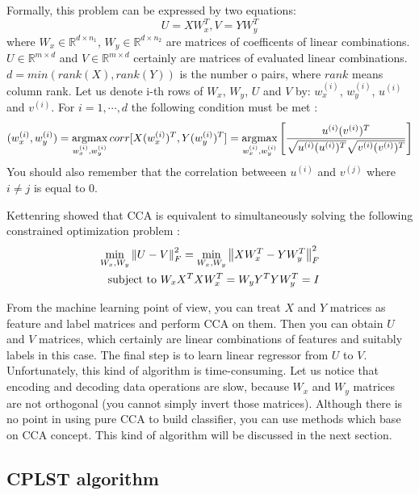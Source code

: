 Formally, this problem can be expressed by two equations:
\begin{equation}\label{eq:cca1}
    U=XW_x^T,   V=YW_y^T    
\end{equation}
where $W_x \in \mathbb{R}^{d \times n_1}$, $W_y \in \mathbb{R}^{d \times n_2}$ are matrices of coefficents of linear combinations. $U \in \mathbb{R}^{m \times d}$ and $V \in \mathbb{R}^{m \times d}$ certainly are matrices of evaluated linear combinations. $d=min(rank(X), rank(Y))$ is the number o pairs, where $rank$ means column rank. Let us denote i-th rows of $W_x$, $W_y$, $U$ and $V$ by: $w_x^{(i)}$, $w_y^{(i)}$, $u^{(i)}$ and $v^{(i)}$. For $i=1,\cdots,d$ the following condition must be met \cite{William}:
\begin{equation}\label{eq:cca2}
    (w_x^{(i)}, w_y^{(i)})=\operatorname*{argmax}_{w_x^{(i)}, w_y^{(i)}} corr[X(w_x^{(i)})^T, Y(w_y^{(i)})^T] = \operatorname*{argmax}_{w_x^{(i)}, w_y^{(i)}} \left[\frac{u^{(i)}(v^{(i)})^T}{\sqrt{u^{(i)}(u^{(i)})^T}\sqrt{v^{(i)}(v^{(i)})^T}}\right] 
\end{equation}
You should also remember that the correlation betweeen $u^{(i)}$ and $v^{(j)}$ where $i\neq j$ is equal to $0$.

Kettenring showed that CCA is equivalent to simultaneously solving the following constrained optimization problem \cite{ChenLin}:
\begin{equation}\label{eq:cca3}
\begin{split}
    \min_{W_x, W_y} \left\lVert U-V\right\rVert_{F}^2 = \min_{W_x, W_y} \left\lVert XW_x^T-YW_y^T\right\rVert_{F}^2 \\ 
    \text{   subject to   } W_xX^TXW_x^T=W_yY^TYW_y^T=I   
\end{split}
\end{equation}

From the machine learning point of view, you can treat $X$ and $Y$ matrices as feature and label matrices and perform CCA on them. Then you can obtain $U$ and $V$ matrices, which certainly are linear combinations of features and suitably labels in this case. The final step is to learn linear regressor from $U$ to $V$. Unfortunately, this kind of algorithm is time-consuming. Let us notice that encoding and decoding data operations are slow, because $W_x$ and $W_y$ matrices are not orthogonal (you cannot simply invert those matrices). Although there is no point in using pure CCA to build classifier, you can use methods which base on CCA concept. This kind of algorithm will be discussed in the next section.

\subsection{CPLST algorithm}

